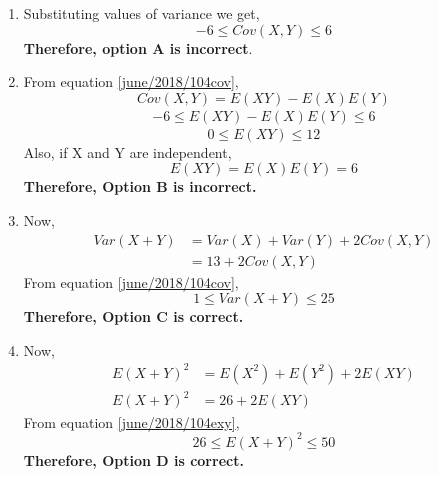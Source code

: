 \begin{enumerate}
\item
Substituting values of variance we get,
\begin{equation}\label{june/2018/104cov}
    -6\leq{Cov(X,Y)}\leq 6
\end{equation}
\textbf{Therefore, option A is incorrect}.\\
\item
From equation \eqref{june/2018/104cov},
\begin{equation}
    {Cov(X,Y)}=E(XY)-E(X)E(Y)
\end{equation}
\begin{align}
    -6\leq E(XY)-E(X)E(Y)\leq 6
\end{align}
\begin{equation}\label{june/2018/104exy}
    0\leq E(XY)\leq12
\end{equation}
Also, if X and Y are independent,
\begin{equation}
    E(XY)=E(X)E(Y)=6
\end{equation}
\textbf{Therefore, Option B is incorrect.}\\
\item
Now,
\begin{align}
    Var(X+Y)&=Var(X)+Var(Y)+2Cov(X,Y)\\
    &=13+2Cov(X,Y)
\end{align}
From equation \eqref{june/2018/104cov},
\begin{equation}
    1\leq Var(X+Y)\leq 25
\end{equation}
\textbf{Therefore, Option C is correct.}\\
\item
Now,
\begin{align}
    E(X+Y)^2 &= E(X^2)+E(Y^2)+2E(XY)\\
    E(X+Y)^2 &= 26+2E(XY)
\end{align}
From equation \eqref{june/2018/104exy},
\begin{equation}
    26\leq E(X+Y)^2\leq50
\end{equation}
\textbf{Therefore, Option D is correct.}\\
\end{enumerate}